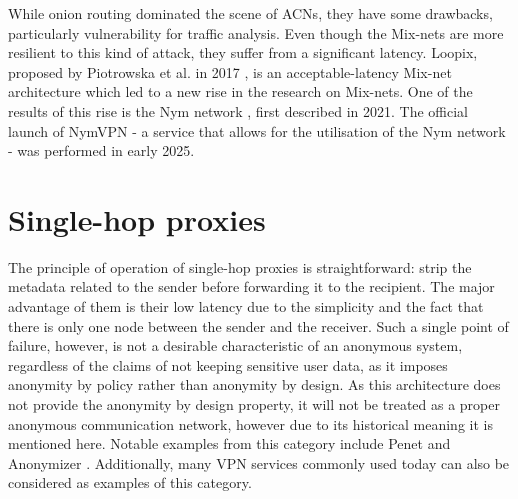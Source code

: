While onion routing dominated the scene of ACNs, they have some drawbacks, particularly vulnerability for traffic analysis. Even though the Mix-nets are more resilient to this kind of attack, they suffer from a significant latency. Loopix, proposed by Piotrowska et al. in 2017 \cite{loopix}, is an acceptable-latency Mix-net architecture which led to a new rise in the research on Mix-nets. One of the results of this rise is the Nym network \cite{nym}, first described in 2021. The official launch of NymVPN - a service that allows for the utilisation of the Nym network - was performed in early 2025.

\section{Single-hop proxies}
The principle of operation of single-hop proxies is straightforward: strip the metadata related to the sender before forwarding it to the recipient. The major advantage of them is their low latency due to the simplicity and the fact that there is only one node between the sender and the receiver. Such a single point of failure, however, is not a desirable characteristic of an anonymous system, regardless of the claims of not keeping sensitive user data, as it imposes anonymity by policy rather than anonymity by design. As this architecture does not provide the anonymity by design property, it will not be treated as a proper anonymous communication network, however due to its historical meaning it is mentioned here.
Notable examples from this category include Penet \cite{penet} and Anonymizer \cite{anonymizer}. Additionally, many VPN services commonly used today can also be considered as examples of this category.

